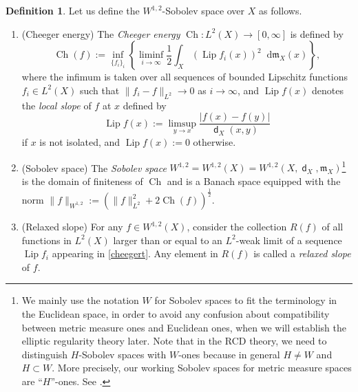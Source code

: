 \documentclass[11pt,reqno]{amsart}
\theoremstyle{definition}
\newtheorem{definition}[theorem]{Definition}
\numberwithin{equation}{section}
\newcommand{\di}{\mathop{}\!\mathrm{d}}
\newcommand{\meas}{\mathfrak{m}}
\DeclareMathOperator{\Ch}{Ch}
\DeclareMathOperator{\dist}{\mathsf{d}}
\DeclareMathOperator{\Lip}{Lip}
\begin{document}
\begin{definition}
    Let us define the $W^{1,2}$-Sobolev space over $X$ as follows.
    \begin{enumerate}
        \item{(Cheeger energy)} The \textit{Cheeger energy} $\Ch:L^2(X) \to [0, \infty]$ is defined by
\begin{equation}\label{cheegert}
\Ch(f):=\inf_{\{f_i\}_i}\left\{ \liminf_{i\to \infty}\frac{1}{2}\int_X\left(\Lip f_i(x)\right)^2\di \meas_X(x) \right\},
\end{equation}
where the infimum is taken over all sequences of bounded Lipschitz functions $f_i\in L^2(X)$ such that $\|f_i-f\|_{L^2}\to0$ as $i\to\infty$, 
 and $\Lip f(x)$ denotes the \textit{local slope} of $f$ at $x$ defined by
\begin{equation*}
\Lip f(x):=\limsup_{y \to x}\frac{|f(x)-f(y)|}{\dist_X(x, y)}
\end{equation*}
if $x$ is not isolated, and $\Lip f(x):=0$ otherwise.
        \item{(Sobolev space)} The \textit{Sobolev space} $W^{1,2}=W^{1,2}(X)=W^{1,2}(X, \dist_X, \meas_X)$\footnote{We mainly use the notation $W$ for Sobolev spaces to fit the terminology in the Euclidean space, in order to avoid any confusion about compatibility between metric measure ones and Euclidean ones, when we will establish the elliptic regularity theory later. Note that in the RCD theory, we need to distinguish $H$-Sobolev spaces with $W$-ones because in general $H\neq W$ and $H\subset W$. More precisely, our working Sobolev spaces for metric measure spaces are ``$H$''-ones. See \cite{Gigli1, Giglisurvey}.} is the domain of finiteness of $\Ch$ and is a Banach space equipped with the norm $\|f\|_{W^{1,2}}:=(\|f\|_{L^2}^2+2\Ch(f))^{\frac{1}{2}}.$ 
        \item{(Relaxed slope)} For any $f \in W^{1,2}(X)$, consider the collection $R(f)$ of all functions in $L^2(X)$ larger than or equal to an $L^2$-weak limit of a sequence $\Lip f_i$ appearing in \eqref{cheegert}. Any element in $R(f)$ is called a \textit{relaxed slope} of $f$. 
    \end{enumerate}
\end{definition}
\end{document}
